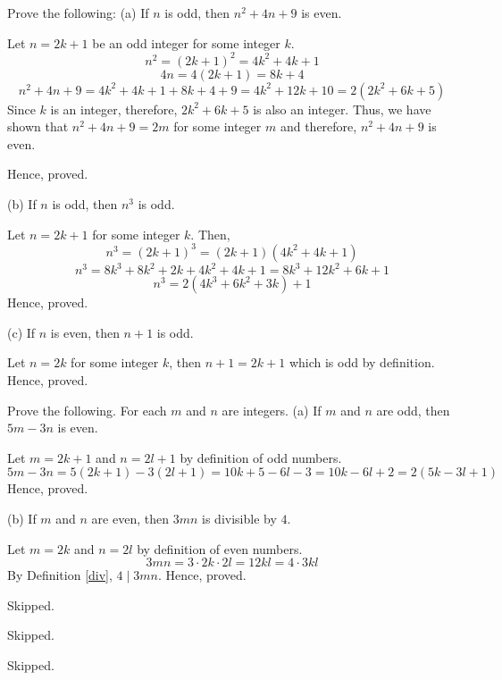 \begin{problem}
	Prove the following:
	\bigbreak
	(a) If $n$ is odd, then $n^2 + 4n + 9$ is even.
	\begin{solution}
		Let $n = 2k+1$ be an odd integer for some integer $k$.
		$$n^2 = (2k+1)^2 = 4k^2 + 4k + 1$$
		$$4n = 4(2k+1) = 8k + 4$$
		$$n^2 + 4n + 9 = 4k^2 + 4k + 1 + 8k + 4 + 9 = 4k^2 + 12k + 10 = 2(2k^2+6k+5)$$
		Since $k$ is an integer, therefore, $2k^2+6k+5$ is also an integer. Thus, we have shown that $n^2 + 4n + 9 = 2m$ for some integer $m$ and therefore, $n^2 + 4n + 9$ is even.

		Hence, proved.
	\end{solution}
	
	(b) If $n$ is odd, then $n^3$ is odd.
	\begin{solution}
		Let $n = 2k+1$ for some integer $k$. Then,
		$$n^3 = (2k+1)^3 = (2k+1)(4k^2+4k+1)$$
		$$n^3 = 8k^3+8k^2+2k+4k^2+4k+1 = 8k^3 + 12k^2 + 6k + 1$$
		$$n^3 = 2(4k^3+6k^2+3k) + 1$$
		Hence, proved.
	\end{solution}

	(c) If $n$ is even, then $n+1$ is odd.
	\begin{solution}
		Let $n = 2k$ for some integer $k$, then $n+1 = 2k+1$ which is odd by definition. Hence, proved.
	\end{solution}
\end{problem}

\begin{problem}
	Prove the following. For each $m$ and $n$ are integers.
	\bigbreak
	(a) If $m$ and $n$ are odd, then $5m-3n$ is even.
	\begin{solution}
		Let $m = 2k+1$ and $n = 2l+1$ by definition of odd numbers.
		$$5m-3n = 5(2k+1)-3(2l+1) = 10k+5-6l-3 = 10k-6l+2 = 2(5k-3l+1)$$
		Hence, proved.
	\end{solution}

	(b) If $m$ and $n$ are even, then $3mn$ is divisible by $4$.
	\begin{solution}
		Let $m = 2k$ and $n = 2l$ by definition of even numbers.
		$$3mn = 3 \cdot 2k \cdot 2l = 12kl = 4 \cdot  3kl$$
		By Definition \ref{div}, $4 \mid 3mn$. Hence, proved.
	\end{solution}
\end{problem}

\begin{problem}Skipped.\end{problem}
\begin{problem}Skipped.\end{problem}
\begin{problem}Skipped.\end{problem}

